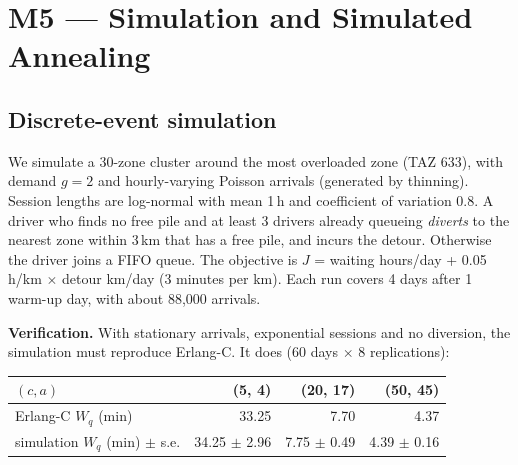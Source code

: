 \documentclass[11pt,a4paper]{article}
\begin{document}
\section{M5 --- Simulation and Simulated Annealing}\label{sec:m5}
\subsection{Discrete-event simulation}
We simulate a 30-zone cluster around the most overloaded zone (TAZ 633), with demand $g = 2$ and hourly-varying Poisson arrivals (generated by thinning). Session lengths are log-normal with mean 1\,h and coefficient of variation 0.8. A driver who finds no free pile and at least 3 drivers already queueing \emph{diverts} to the nearest zone within 3\,km that has a free pile, and incurs the detour. Otherwise the driver joins a FIFO queue. The objective is $J$ = waiting hours/day + 0.05\,h/km $\times$ detour km/day (3 minutes per km). Each run covers 4 days after 1 warm-up day, with about 88{,}000 arrivals.

\textbf{Verification.} With stationary arrivals, exponential sessions and no diversion, the simulation must reproduce Erlang-C. It does (60 days $\times$ 8 replications):
\begin{center}\small
\begin{tabular}{@{}lrrr@{}}\toprule
$(c, a)$ & (5, 4) & (20, 17) & (50, 45)\\\midrule
Erlang-C $W_q$ (min) & 33.25 & 7.70 & 4.37\\
simulation $W_q$ (min) $\pm$ s.e. & 34.25 $\pm$ 2.96 & 7.75 $\pm$ 0.49 & 4.39 $\pm$ 0.16\\\bottomrule
\end{tabular}\end{center}
\end{document}
